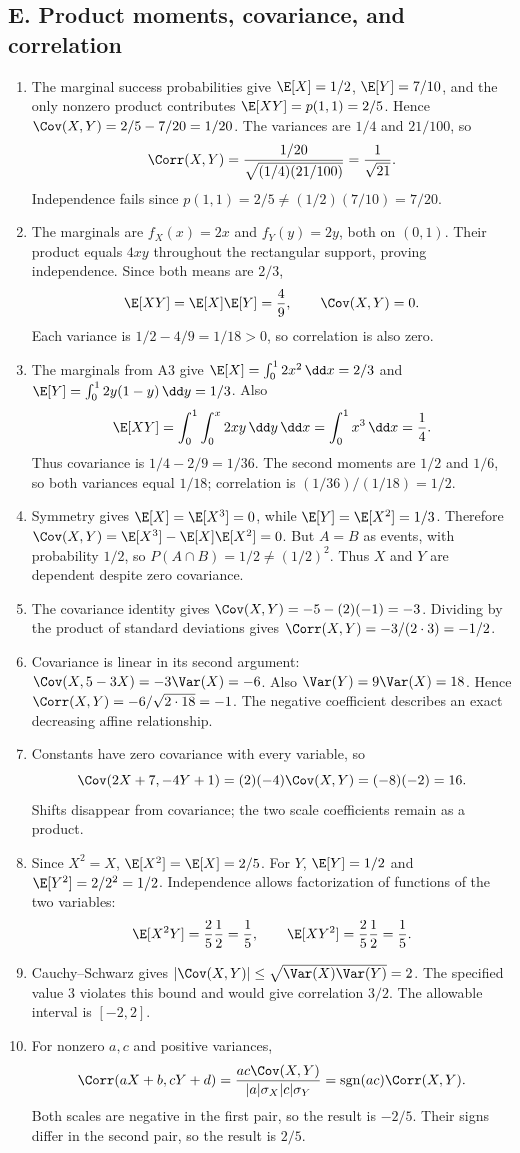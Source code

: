 \subsection{E. Product moments, covariance, and correlation}
\begin{enumerate}[label=\textbf{E\arabic*.},leftmargin=*,itemsep=1em]
\item The marginal success probabilities give $\E[X]=1/2$, $\E[Y]=7/10$, and the only nonzero product contributes $\E[XY]=p(1,1)=2/5$. Hence $\Cov(X,Y)=2/5-7/20=1/20$. The variances are $1/4$ and $21/100$, so
\[
\Corr(X,Y)=\frac{1/20}{\sqrt{(1/4)(21/100)}}=\frac1{\sqrt{21}}.
\]
Independence fails since $p(1,1)=2/5\ne(1/2)(7/10)=7/20$.
\item The marginals are $f_X(x)=2x$ and $f_Y(y)=2y$, both on $(0,1)$. Their product equals $4xy$ throughout the rectangular support, proving independence. Since both means are $2/3$,
\[
\E[XY]=\E[X]\E[Y]=\frac49,\qquad \Cov(X,Y)=0.
\]
Each variance is $1/2-4/9=1/18>0$, so correlation is also zero.
\item The marginals from A3 give $\E[X]=\int_0^12x^2\,\dd x=2/3$ and $\E[Y]=\int_0^12y(1-y)\,\dd y=1/3$. Also
\[
\E[XY]=\int_0^1\int_0^x2xy\,\dd y\,\dd x=\int_0^1x^3\,\dd x=\frac14.
\]
Thus covariance is $1/4-2/9=1/36$. The second moments are $1/2$ and $1/6$, so both variances equal $1/18$; correlation is $(1/36)/(1/18)=1/2$.
\item Symmetry gives $\E[X]=\E[X^3]=0$, while $\E[Y]=\E[X^2]=1/3$. Therefore $\Cov(X,Y)=\E[X^3]-\E[X]\E[X^2]=0$. But $A=B$ as events, with probability $1/2$, so $P(A\cap B)=1/2\ne(1/2)^2$. Thus $X$ and $Y$ are dependent despite zero covariance.
\item The covariance identity gives $\Cov(X,Y)=-5-(2)(-1)=-3$. Dividing by the product of standard deviations gives $\Corr(X,Y)=-3/(2\cdot3)=-1/2$.
\item Covariance is linear in its second argument: $\Cov(X,5-3X)=-3\Var(X)=-6$. Also $\Var(Y)=9\Var(X)=18$. Hence $\Corr(X,Y)=-6/\sqrt{2\cdot18}=-1$. The negative coefficient describes an exact decreasing affine relationship.
\item Constants have zero covariance with every variable, so
\[
\Cov(2X+7,-4Y+1)=(2)(-4)\Cov(X,Y)=(-8)(-2)=16.
\]
Shifts disappear from covariance; the two scale coefficients remain as a product.
\item Since $X^2=X$, $\E[X^2]=\E[X]=2/5$. For $Y$, $\E[Y]=1/2$ and $\E[Y^2]=2/2^2=1/2$. Independence allows factorization of functions of the two variables:
\[
\E[X^2Y]=\frac25\frac12=\frac15,\qquad
\E[XY^2]=\frac25\frac12=\frac15.
\]
\item Cauchy--Schwarz gives $|\Cov(X,Y)|\leq\sqrt{\Var(X)\Var(Y)}=2$. The specified value $3$ violates this bound and would give correlation $3/2$. The allowable interval is $[-2,2]$.
\item For nonzero $a,c$ and positive variances,
\[
\Corr(aX+b,cY+d)=\frac{ac\Cov(X,Y)}{|a|\sigma_X|c|\sigma_Y}
=\operatorname{sgn}(ac)\Corr(X,Y).
\]
Both scales are negative in the first pair, so the result is $-2/5$. Their signs differ in the second pair, so the result is $2/5$.
\end{enumerate}

